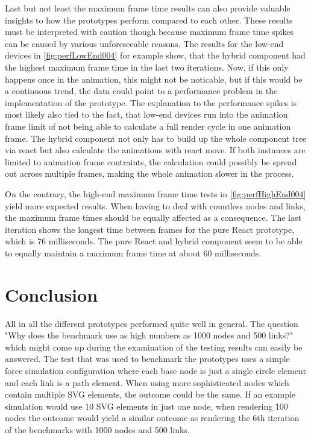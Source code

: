 Last but not least the maximum frame time results can also provide valuable insights to how the prototypes perform compared to each other. These results must be interpreted with caution though because maximum frame time spikes can be caused by various unforeseeable reasons. The results for the low-end devices in \ref{fig:perfLowEnd004} for example show, that the hybrid component had the highest maximum frame time in the last two iterations. Now, if this only happens once in the animation, this might not be noticable, but if this would be a continuous trend, the data could point to a performance problem in the implementation of the prototype. The explanation to the performance spikes is most likely also tied to the fact, that low-end devices run into the animation frame limit of not being able to calculate a full render cycle in one animation frame. The hybrid component not only has to build up the whole component tree via react but also calculate the animations with react move. If both instances are limited to animation frame contraints, the calculation could possibly be spread out across multiple frames, making the whole animation slower in the process.

On the contrary, the high-end maximum frame time tests in \ref{fig:perfHighEnd004} yield more expected results. When having to deal with countless nodes and links, the maximum frame times should be equally affected as a consequence. The last iteration shows the longest time between frames for the pure React prototype, which is 76 milliseconds. The pure React and hybrid component seem to be able to equally maintain a maximum frame time at about 60 milliseconds.


\section{Conclusion}

All in all the different prototypes performed quite well in general. The question "Why does the benchmark use as high numbers as 1000 nodes and 500 links?" which might come up during the examination of the testing results can easily be answered. The test that was used to benchmark the prototypes uses a simple force simulation configuration where each base node is just a single circle element and each link is a path element. When using more sophisticated nodes which contain multiple SVG elements, the outcome could be the same. If an example simulation would use 10 SVG elements in just one node, when rendering 100 nodes the outcome would yield a similar outcome as rendering the 6th iteration of the benchmarks with 1000 nodes and 500 links.

